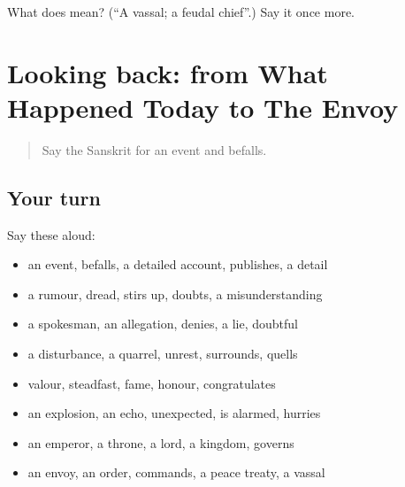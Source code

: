 \begin{tcolorbox}[breakable,colback=teal!4,colframe=teal!35!black,title={Before you move on}]
What does  mean? (\textquotedblleft{}A vassal; a feudal chief\textquotedblright{}.) Say it once more.
\end{tcolorbox}
\section[(dialogue)]{Looking back: from What Happened Today to The Envoy}

\label{lesson:SA-R317-review-310-317}



\begin{quote}
Say the Sanskrit for an event and befalls.
\end{quote}

\subsection*{Your turn}
Say these aloud:

\begin{itemize}
\raggedright
  \item an event, befalls, a detailed account, publishes, a detail
  \item a rumour, dread, stirs up, doubts, a misunderstanding
  \item a spokesman, an allegation, denies, a lie, doubtful
  \item a disturbance, a quarrel, unrest, surrounds, quells
  \item valour, steadfast, fame, honour, congratulates
  \item an explosion, an echo, unexpected, is alarmed, hurries
  \item an emperor, a throne, a lord, a kingdom, governs
  \item an envoy, an order, commands, a peace treaty, a vassal
\end{itemize}


